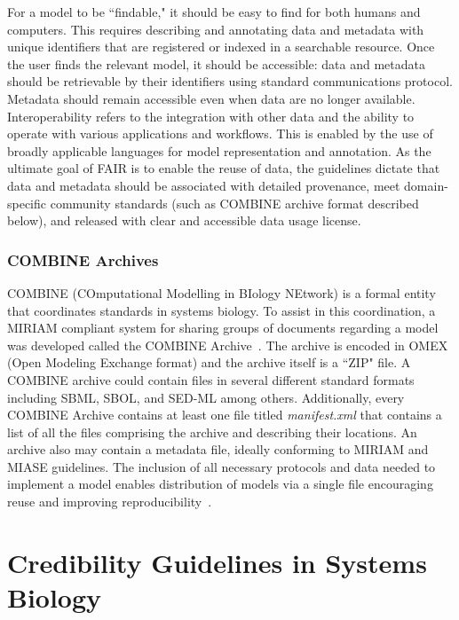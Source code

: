 \documentclass[12pt]{report}
\begin{document}
For a model to be ``findable," it should be easy to find for both humans and computers. This requires describing and annotating data and metadata with unique identifiers that are registered or indexed in a searchable resource. Once the user finds the relevant model, it should be accessible: data and metadata should be retrievable by their identifiers using standard communications protocol. Metadata should remain accessible even when data are no longer available. Interoperability refers to the integration with other data and the ability to operate with various applications and workflows. This is enabled by the use of broadly applicable languages for model representation and annotation. As the ultimate goal of FAIR is to enable the reuse of data, the guidelines dictate that data and metadata should be associated with detailed provenance, meet domain-specific community standards (such as COMBINE archive format described below), and released with clear and accessible data usage license.


\subsubsection{COMBINE Archives}
COMBINE (COmputational Modelling in BIology NEtwork) is a formal entity that coordinates standards in systems biology.  To assist in this coordination, a MIRIAM compliant system for sharing groups of documents regarding a model was developed called the COMBINE Archive~\cite{schreiber_specifications_2020}. The archive is encoded in OMEX (Open Modeling Exchange format) and the archive itself is a ``ZIP" file. A COMBINE archive could contain files in several different standard formats including SBML, SBOL, and SED-ML among others. Additionally, every COMBINE Archive contains at least one file titled \textit{manifest.xml} that contains a list of all the files comprising the archive and describing their locations. An archive also may contain a metadata file, ideally conforming to MIRIAM and MIASE guidelines. The inclusion of all necessary protocols and data needed to implement a model enables distribution of models via a single file encouraging reuse and improving reproducibility~\cite{bergmann_combine_2014}.



\section{Credibility Guidelines in Systems Biology}
\end{document}
